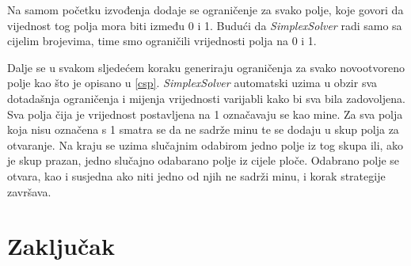 \documentclass{article}
\begin{document}
Na samom početku izvođenja dodaje se ograničenje za svako polje, koje govori da vijednost tog polja mora biti između 0 i 1. Budući da \textit{SimplexSolver} radi samo sa cijelim brojevima, time smo ograničili vrijednosti polja na 0 i 1.

Dalje se u svakom sljedećem koraku generiraju ograničenja za svako novootvoreno polje kao što je opisano u \ref{csp}. \textit{SimplexSolver} automatski uzima u obzir sva dotadašnja ograničenja i mijenja vrijednosti varijabli kako bi sva bila zadovoljena. Sva polja čija je vrijednost postavljena na 1 označavaju se kao mine. Za sva polja koja nisu označena s 1 smatra se da ne sadrže minu te se dodaju u skup polja za otvaranje. Na kraju se uzima slučajnim odabirom jedno polje iz tog skupa ili, ako je skup prazan, jedno slučajno odabarano polje iz cijele ploče. Odabrano polje se otvara, kao i susjedna ako niti jedno od njih ne sadrži minu, i korak strategije završava.

\section{Zaključak}
\end{document}
